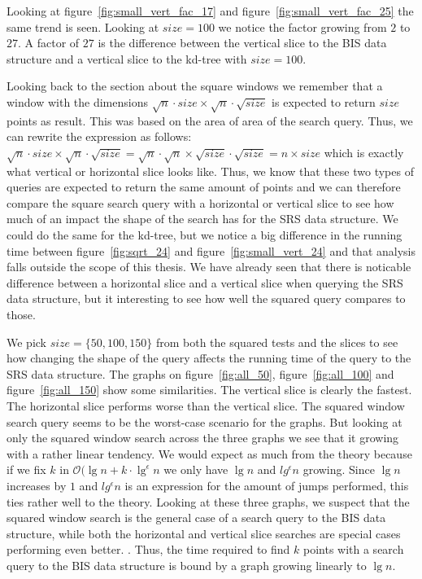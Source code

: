 Looking at figure~\ref{fig:small_vert_fac_17} and figure~\ref{fig:small_vert_fac_25} the same trend is seen. Looking at $size = 100$ we notice the factor growing from $2$ to $27$. A factor of $27$ is the difference between the vertical slice to the BIS data structure and a vertical slice to the kd-tree with $size = 100$.

Looking back to the section about the square windows we remember that a window with the dimensions $\sqrt{n}\cdot{size} \times \sqrt{n}\cdot\sqrt{size}$ is expected to return $size$ points as result. This was based on the area of area of the search query. Thus, we can rewrite the expression as follows: $\sqrt{n}\cdot{size} \times \sqrt{n}\cdot\sqrt{size} = \sqrt{n}\cdot\sqrt{n} \times \sqrt{size}\cdot\sqrt{size} = n \times size$ which is exactly what vertical or horizontal slice looks like. Thus, we know that these two types of queries are expected to return the same amount of points and we can therefore compare the square search query with a horizontal or vertical slice to see how much of an impact the shape of the search has for the SRS data structure. We could do the same for the kd-tree, but we notice a big difference in the running time between figure~\ref{fig:sqrt_24} and figure~\ref{fig:small_vert_24} and that analysis falls outside the scope of this thesis. We have already seen that there is noticable difference between a horizontal slice and a vertical slice when querying the SRS data structure, but it interesting to see how well the squared query compares to those. 


We pick $size=\{50,100,150\}$ from both the squared tests and the slices to see how changing the shape of the query affects the running time of the query to the SRS data structure. The graphs on figure~\ref{fig:all_50}, figure~\ref{fig:all_100} and figure~\ref{fig:all_150} show some similarities. The vertical slice is clearly the fastest. The horizontal slice performs worse than the vertical slice. The squared window search query seems to be the worst-case scenario for the graphs. But looking at only the squared window search across the three graphs we see that it growing with a rather linear tendency. We would expect as much from the theory because if we fix $k$ in $\mathcal{O}(\lg n + k\cdot \lg^\epsilon n$ we only have $\lg n$ and $lg^\epsilon n$ growing. Since $\lg n$ increases by $1$ and $lg^\epsilon n$ is an expression for the amount of jumps performed, this ties rather well to the theory. Looking at these three graphs, we suspect that the squared window search is the general case of a search query to the BIS data structure, while both the horizontal and vertical slice searches are special cases performing even better. . Thus, the time required to find $k$ points with a search query to the BIS data structure is bound by a graph growing linearly to $\lg n$. 

